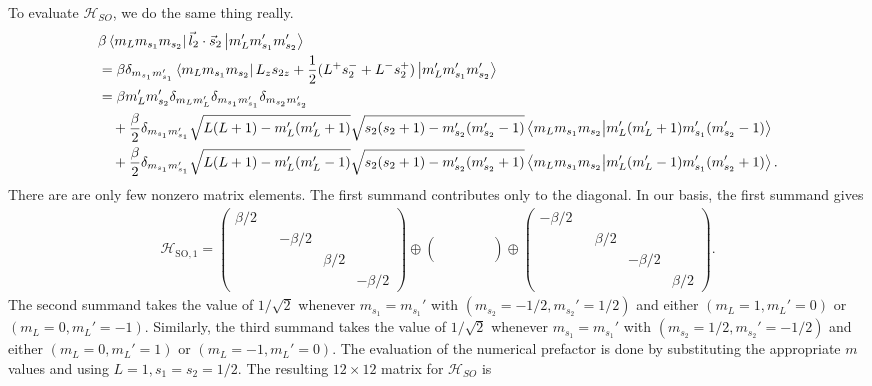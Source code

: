 \documentclass{article}
\theoremstyle{definition}
\newcommand{\ham}{\mathcal{H}}
\newcommand{\be}{\beta}
\newcommand{\f}[2]{\frac{#1}{#2}}
\begin{document}
\begin{enumerate}[label=(\alph*)]
	
	To evaluate $\ham_{SO}$, we do the same thing really.  
	\begin{align*}
	&\be \bra{m_L m_{s_1} m_{s_2}} \vec{l}_2 \cdot \vec{s}_2 \ket{ m_L' m_{s_1}' m_{s_2}'} \\
	&= \be \delta_{m_{s_1}m_{s_1}'} \bra{m_L m_{s_1} m_{s_2}} L_z s_{2z} + \f{1}{2}(L^+s_2^- + L^- s_2^+)\ket{ m_L' m_{s_1}' m_{s_2}'} \\
	&= \be m_L'm_{s_2}' \delta_{m_L m_L'}\delta_{m_{s_1} m_{s_1}'}\delta_{m_{s_2} m_{s_2}'} \\
	&\quad + \f{\be}{2}\delta_{m_{s_1} m_{s_1}'}\sqrt{L(L+1)-m_L'(m_L'+1)}\sqrt{s_2(s_2+1)-m_{s_2}'(m_{s_2}'-1)} \bra{m_L m_{s_1}m_{s_2}}\ket{m_L'(m_L'+1) m_{s_1}'(m_{s_2}'-1)} \\
	&\quad + \f{\be}{2}\delta_{m_{s_1} m_{s_1}'}\sqrt{L(L+1)-m_L'(m_L'-1)}\sqrt{s_2(s_2+1)-m_{s_2}'(m_{s_2}'+1)} \bra{m_L m_{s_1}m_{s_2}}\ket{m_L'(m_L'-1) m_{s_1}'(m_{s_2}'+1)}.
	\end{align*}
	There are are only few nonzero matrix elements. The first summand contributes only to the diagonal. In our basis, the first summand gives
	\begin{align*}
	\ham_{\text{SO},1} =  \begin{pmatrix}
	\be/2 & & & \\
	& &-\be/2 &  &\\
	& & & \be/2 &\\
	& & & & -\be/2
	\end{pmatrix} \oplus \begin{pmatrix}
	 & & & \\
	& & &  &\\
	& & &  &\\
	& & & & 
	\end{pmatrix}
	\oplus 
	\begin{pmatrix}
	-\be/2 & & & \\
	& &\be/2 &  &\\
	& & & -\be/2 &\\
	& & & & \be/2
	\end{pmatrix}.
	\end{align*}
	The second summand takes the value of $1/\sqrt{2}$ whenever $m_{s_1} = m_{s_1}'$ with $(m_{s_2} = -1/2, m_{s_2}' = 1/2)$ and either $(m_L=1,m_L'=0)$ or $(m_L=0,m_L'=-1)$. Similarly, the third summand takes the value of $1/\sqrt{2}$ whenever $m_{s_1} = m_{s_1}'$ with $(m_{s_2} = 1/2, m_{s_2}' = -1/2)$ and either $(m_L=0,m_L'=1)$ or $(m_L=-1,m_L'=0)$. The evaluation of the numerical prefactor is done by substituting the appropriate $m$ values and using $L=1, s_1 = s_2 = 1/2$. The resulting $12\times 12$ matrix for $\ham_{SO}$ is 

\end{enumerate}
\end{document}
